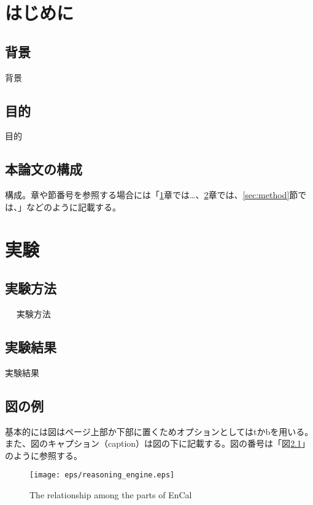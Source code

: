 \documentclass[12pt,epsf]{jreport}
\begin{document}
\tableofcontents %
\listoffigures %
\listoftables %


\chapter{はじめに} \label{chap:intro}
\setcounter{page}{1}   %

 \section{背景}
 背景


 \section{目的}
 目的


 \section{本論文の構成}
 構成。章や節番号を参照する場合には「\ref{chap:intro}章では…、\ref{chap:exp}章では、\ref{sec:method}節では、」などのように記載する。
 

\chapter{実験} \label{chap:exp}
 \section{実験方法}　\label{sec:method}
 実験方法

 \section{実験結果}
 実験結果

 
 \section{図の例}

 基本的には図はページ上部か下部に置くためオプションとしてはtかbを用いる。また、図のキャプション（caption）は図の下に記載する。図の番号は「図\ref{fig:reasoning_engine}」のように参照する。
 
 \begin{figure}[tb]
 \begin{center}
  \texttt{[image: eps/reasoning\_engine.eps]}
  \caption{The relationship among the parts of EnCal}
  \label{fig:reasoning_engine}
 \end{center}
\end{figure}
\end{document}
